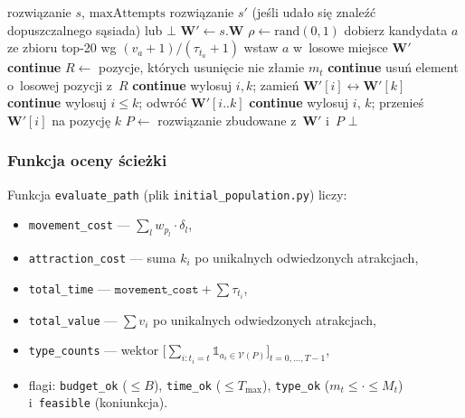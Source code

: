 \begin{algorithm}[H]
\caption{\textsc{MutacjaWaypointow}}
\label{alg:mutate}
\begin{algorithmic}[1]
\Require rozwiązanie $s$, $\mathrm{maxAttempts}$
\Ensure rozwiązanie $s'$ (jeśli udało się znaleźć dopuszczalnego sąsiada) lub $\bot$
    \State $\mathbf{W}' \gets s.\mathbf{W}$
    \State $\rho \gets \mathrm{rand}(0, 1)$
     
        \State dobierz kandydata $a$ ze zbioru top-20 wg $(v_a+1)/(\tau_{t_a}+1)$
            \State wstaw $a$ w~losowe miejsce $\mathbf{W}'$
        \Else \State \textbf{continue}
        \EndIf
     
        \State $R \gets$ pozycje, których usunięcie nie złamie $m_{t}$
         \textbf{continue} \EndIf
        \State usuń element o~losowej pozycji z~$R$
     
         \textbf{continue} \EndIf
        \State wylosuj $i, k$; zamień $\mathbf{W}'[i] \leftrightarrow \mathbf{W}'[k]$
     
         \textbf{continue} \EndIf
        \State wylosuj $i \le k$; odwróć $\mathbf{W}'[i..k]$
    \Else {}
         \textbf{continue} \EndIf
        \State wylosuj $i$, $k$; przenieś $\mathbf{W}'[i]$ na pozycję $k$
    \EndIf
    \State $P \gets$ 
        \State \Return rozwiązanie zbudowane z~$\mathbf{W}'$ i~$P$
    \EndIf
\EndFor
\State \Return $\bot$
\end{algorithmic}
\end{algorithm}

\subsubsection{Funkcja oceny ścieżki}
\label{sec:eval}

Funkcja \texttt{evaluate\_path} (plik \texttt{initial\_population.py}) liczy:
\begin{itemize}
    \item \texttt{movement\_cost} --- $\sum_{l} w_{p_l}\cdot\delta_l$,
    \item \texttt{attraction\_cost} --- suma $k_i$ po unikalnych odwiedzonych atrakcjach,
    \item \texttt{total\_time} --- $\texttt{movement\_cost} + \sum \tau_{t_i}$,
    \item \texttt{total\_value} --- $\sum v_i$ po unikalnych odwiedzonych atrakcjach,
    \item \texttt{type\_counts} --- wektor $\big[\sum_{i: t_i = t} \mathbb{1}_{a_i \in \mathcal{V}(P)}\big]_{t = 0, \dots, T-1}$,
    \item flagi: \texttt{budget\_ok} ($\le B$), \texttt{time\_ok} ($\le T_{\max}$),
          \texttt{type\_ok} ($m_t \le \cdot \le M_t$) i~\texttt{feasible} (koniunkcja).
\end{itemize}

